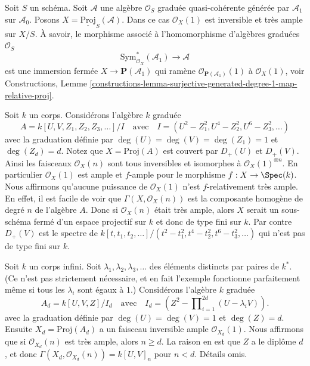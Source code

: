 \begin{example}
\label{example-very-ample}
Soit $S$ un schéma. Soit $\mathcal{A}$ une algèbre $\mathcal{O}_S$
graduée quasi-cohérente générée par $\mathcal{A}_1$ sur $\mathcal{A}_0$.
Posons $X = \underline{\text{Proj}}_S(\mathcal{A})$. Dans ce cas $\mathcal{O}_X(1)$ est inversible
et très ample sur $X/S$. À savoir, le morphisme
associé à l'homomorphisme d'algèbres graduées $\mathcal{O}_S$
$$
\text{Sym}_{\mathcal{O}_X}^*(\mathcal{A}_1)
\longrightarrow
\mathcal{A}
$$
est une immersion fermée $X \to \mathbf{P}(\mathcal{A}_1)$
qui ramène $\mathcal{O}_{\mathbf{P}(\mathcal{A}_1)}(1)$ à $\mathcal{O}_X(1)$,
voir
Constructions, Lemme \ref{constructions-lemma-surjective-generated-degree-1-map-relative-proj}.
\end{example}

\begin{example}
\label{example-not-finite-type-proj}
Soit $k$ un corps.
Considérons l'algèbre $k$ graduée
$$
A = k[U, V, Z_1, Z_2, Z_3, \ldots]/I
\quad
\text{avec}
\quad
I = (U^2 - Z_1^2, U^4 - Z_2^2, U^6 - Z_3^2, \ldots)
$$
avec la graduation définie par $\deg(U) = \deg(V) = \deg(Z_1) = 1$ et $\deg(Z_d) = d$.
Notez que $X = \text{Proj}(A)$
est couvert par $D_{+}(U)$ et $D_{+}(V)$. Ainsi les faisceaux
$\mathcal{O}_X(n)$ sont tous inversibles et isomorphes
à $\mathcal{O}_X(1)^{\otimes n}$. En particulier $\mathcal{O}_X(1)$ est ample et
$f$-ample pour le morphisme $f : X \to \Spec(k)$. Nous
affirmons qu'aucune puissance de $\mathcal{O}_X(1)$
n'est $f$-relativement très ample. En effet, il est facile
de voir que $\Gamma(X, \mathcal{O}_X(n))$ est la composante homogène de degré $n$
de l'algèbre $A$. Donc si $\mathcal{O}_X(n)$ était très ample, alors
$X$ serait un sous-schéma fermé d'un espace projectif sur
$k$ et donc de type fini sur $k$. Par contre
$D_{+}(V)$ est le
spectre de $k[t, t_1, t_2, \ldots]/(t^2 - t_1^2, t^4 - t_2^2, t^6 - t_3^2, \ldots)$ qui n'est pas de type
fini sur $k$.
\end{example}

\begin{example}
\label{example-not-bounded}
Soit $k$ un corps infini. Soit $\lambda_1, \lambda_2, \lambda_3, \ldots$ des éléments distincts par paires
de $k^*$. (Ce n'est pas strictement nécessaire, et en fait l'exemple
fonctionne parfaitement même si tous les $\lambda_i$ sont égaux à $1$.)
Considérons
l'algèbre $k$ graduée
$$
A_d = k[U, V, Z]/I_d
\quad
\text{avec}
\quad
I_d = (Z^2 - \prod\nolimits_{i = 1}^{2d} (U - \lambda_i V)).
$$
avec la graduation définie par $\deg(U) = \deg(V) = 1$ et $\deg(Z) = d$. Ensuite $X_d = \text{Proj}(A_d)$ a un faisceau inversible ample
$\mathcal{O}_{X_d}(1)$. Nous affirmons que si $\mathcal{O}_{X_d}(n)$ est
très ample, alors $n \geq d$. La raison en est que $Z$
a le diplôme $d$, et donc $\Gamma(X_d, \mathcal{O}_{X_d}(n)) =
k[U, V]_n$
pour $n < d$. Détails omis.
\end{example}

